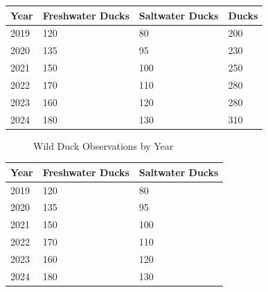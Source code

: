 \documentclass[11pt,a4paper]{article}
\begin{document}
\begin{table}[h]
\begin{tabular}{|l|l|l|l|}
\hline
Year & Freshwater Ducks & Saltwater Ducks & Ducks \\ \hline
2019 & 120 & 80 & 200 \\ \hline
2020 & 135 & 95 & 230 \\ \hline
2021 & 150 & 100 & 250 \\ \hline
2022 & 170 & 110 & 280 \\ \hline
2023 & 160 & 120 & 280 \\ \hline
2024 & 180 & 130 & 310 \\ \hline
\end{tabular}
\end{table}

\begin{figure}[h]
\caption{Wild Duck Observations by Year}
\end{figure}

\begin{table}[h]
\begin{tabular}{|l|l|l|}
\hline
Year & Freshwater Ducks & Saltwater Ducks \\ \hline
2019 & 120 & 80 \\ \hline
2020 & 135 & 95 \\ \hline
2021 & 150 & 100 \\ \hline
2022 & 170 & 110 \\ \hline
2023 & 160 & 120 \\ \hline
2024 & 180 & 130 \\ \hline
\end{tabular}
\end{table}
\end{document}
